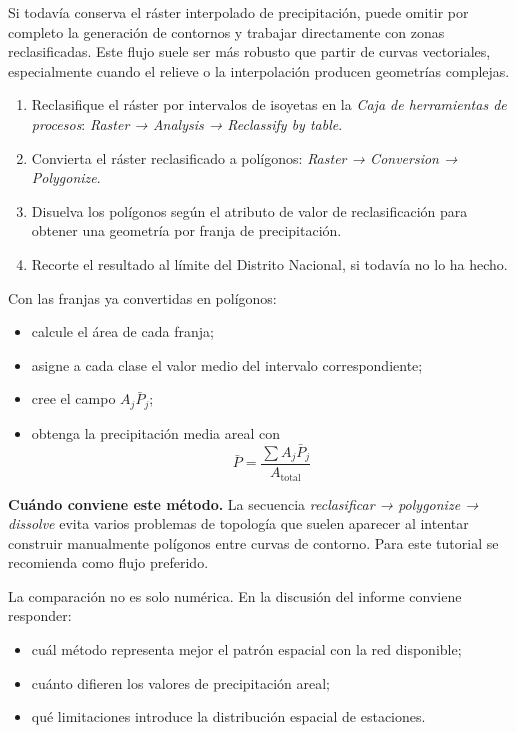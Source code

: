 \documentclass[11pt]{article}
\begin{document}
Si todavía conserva el ráster interpolado de precipitación, puede omitir por
completo la generación de contornos y trabajar directamente con zonas
reclasificadas. Este flujo suele ser más robusto que partir de curvas vectoriales,
especialmente cuando el relieve o la interpolación producen geometrías complejas.

\begin{enumerate}
  \item Reclasifique el ráster por intervalos de isoyetas en la
        \emph{Caja de herramientas de procesos}:
        \emph{Raster → Analysis → Reclassify by table}.
  \item Convierta el ráster reclasificado a polígonos:
        \emph{Raster → Conversion → Polygonize}.
  \item Disuelva los polígonos según el atributo de valor de reclasificación para
        obtener una geometría por franja de precipitación.
  \item Recorte el resultado al límite del Distrito Nacional, si todavía no lo ha hecho.
\end{enumerate}


Con las franjas ya convertidas en polígonos:
\begin{itemize}
  \item calcule el área de cada franja;
  \item asigne a cada clase el valor medio del intervalo correspondiente;
  \item cree el campo $A_j \bar{P}_j$;
  \item obtenga la precipitación media areal con
        \[
          \bar{P} = \frac{\sum A_j \bar{P}_j}{A_{\text{total}}}
        \]
\end{itemize}

\begin{infobox}
\textbf{Cuándo conviene este método.}
La secuencia \emph{reclasificar → polygonize → dissolve} evita varios problemas
de topología que suelen aparecer al intentar construir manualmente polígonos entre
curvas de contorno. Para este tutorial se recomienda como flujo preferido.
\end{infobox}


La comparación no es solo numérica. En la discusión del informe conviene
responder:
\begin{itemize}
  \item cuál método representa mejor el patrón espacial con la red disponible;
  \item cuánto difieren los valores de precipitación areal;
  \item qué limitaciones introduce la distribución espacial de estaciones.
\end{itemize}
\end{document}
